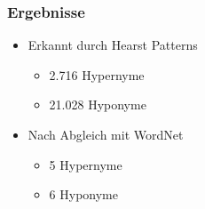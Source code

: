 \begin{frame}
  \frametitle{Ergebnisse}

  \begin{itemize}
  \item Erkannt durch Hearst Patterns
    \begin{itemize}
    \item 2.716 Hypernyme
    \item 21.028 Hyponyme
    \end{itemize}

  \item Nach Abgleich mit WordNet
    \begin{itemize}
    \item 5 Hypernyme
    \item 6 Hyponyme
    \end{itemize}

  \end{itemize}
\end{frame}
